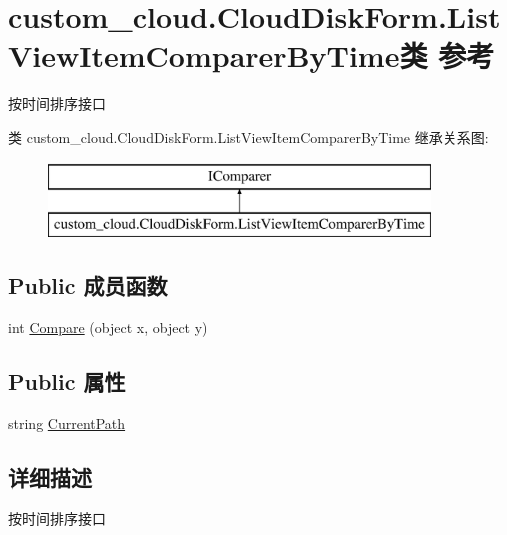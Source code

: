 \hypertarget{classcustom__cloud_1_1_cloud_disk_form_1_1_list_view_item_comparer_by_time}{}\section{custom\+\_\+cloud.\+Cloud\+Disk\+Form.\+List\+View\+Item\+Comparer\+By\+Time类 参考}
\label{classcustom__cloud_1_1_cloud_disk_form_1_1_list_view_item_comparer_by_time}


按时间排序接口  


类 custom\+\_\+cloud.\+Cloud\+Disk\+Form.\+List\+View\+Item\+Comparer\+By\+Time 继承关系图\+:\begin{figure}[H]
\begin{center}
\leavevmode
\includegraphics[height=2.000000cm]{classcustom__cloud_1_1_cloud_disk_form_1_1_list_view_item_comparer_by_time}
\end{center}
\end{figure}
\subsection*{Public 成员函数}
\begin{DoxyCompactItemize}
\item 
int \hyperlink{classcustom__cloud_1_1_cloud_disk_form_1_1_list_view_item_comparer_by_time_aec3e3a6d1d76aa5b9912e290ebc01580}{Compare} (object x, object y)
\end{DoxyCompactItemize}
\subsection*{Public 属性}
\begin{DoxyCompactItemize}
\item 
string \hyperlink{classcustom__cloud_1_1_cloud_disk_form_1_1_list_view_item_comparer_by_time_ac91bf5174cee531264e35be7a62702c9}{Current\+Path}
\end{DoxyCompactItemize}


\subsection{详细描述}
按时间排序接口 



